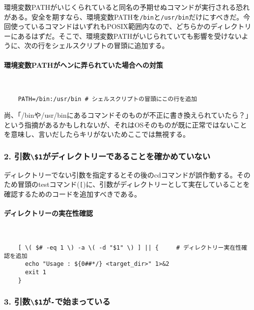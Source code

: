 環境変数PATHがいじくられていると同名の予期せぬコマンドが実行される恐れがある。安全を期すなら、環境変数PATHを\verb|/bin|と\verb|/usr/bin|だけにすべきだ。今回使っているコマンドはいずれもPOSIX範囲内なので、どちらかのディレクトリーにあるはずだ。そこで、環境変数PATHがいじられていても影響を受けないように、次の行をシェルスクリプトの冒頭に追加する。

\paragraph{環境変数PATHがヘンに弄られていた場合への対策} 　\\
\begin{frameboxit}{160.0mm}
\begin{verbatim}
	PATH=/bin:/usr/bin # シェルスクリプトの冒頭にこの行を追加
\end{verbatim}
\end{frameboxit}

尚、「/binや/usr/binにあるコマンドそのものが不正に書き換えられていたら？」という指摘があるかもしれないが、それはOSそのものが既に正常ではないことを意味し、言いだしたらキリがないためここでは無視する。

\subsubsection*{2. 引数\verb|\$1|がディレクトリーであることを確かめていない}

ディレクトリーでない引数を指定するとその後のcdコマンドが誤作動する。そのため冒頭のtestコマンド(\verb|[|)に、引数がディレクトリーとして実在していることを確認するためのコードを追加すべきである。

\paragraph{ディレクトリーの実在性確認} 　\\
\begin{frameboxit}{160.0mm}
\begin{verbatim}
	[ \( $# -eq 1 \) -a \( -d "$1" \) ] || {     # ディレクトリー実在性確認を追加
	  echo "Usage : ${0##*/} <target_dir>" 1>&2
	  exit 1
	}
\end{verbatim}
\end{frameboxit}

\subsubsection*{3. 引数\verb|\$1|が\verb|-|で始まっている}

